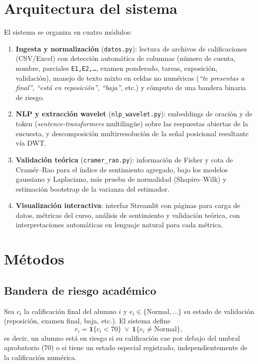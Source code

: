 \documentclass[11pt,a4paper,oneside]{article}
\theoremstyle{definition}
\begin{document}
\section{Arquitectura del sistema}

El sistema se organiza en cuatro módulos:

\begin{enumerate}[leftmargin=1.4em]
  \item \textbf{Ingesta y normalización} (\texttt{datos.py}): lectura de archivos de
  calificaciones (CSV/Excel) con detección automática de columnas (número de cuenta, nombre,
  parciales \texttt{E1,E2,\dots}, examen ponderado, tareas, exposición, validación), manejo de
  texto mixto en celdas no numéricas (\emph{``te presentas a final''}, \emph{``está en
  reposición''}, \emph{``baja''}, etc.) y cómputo de una bandera binaria de riesgo.
  \item \textbf{NLP y extracción wavelet} (\texttt{nlp\_wavelet.py}): embeddings de oración y de
  token (\emph{sentence-transformers} multilingüe) sobre las respuestas abiertas de la encuesta,
  y descomposición multirresolución de la señal posicional resultante vía DWT.
  \item \textbf{Validación teórica} (\texttt{cramer\_rao.py}): información de Fisher y cota de
  Cramér--Rao para el índice de sentimiento agregado, bajo los modelos gaussiano y Laplaciano,
  más prueba de normalidad (Shapiro--Wilk) y estimación bootstrap de la varianza del estimador.
  \item \textbf{Visualización interactiva}: interfaz Streamlit con páginas para carga de datos,
  métricas del curso, análisis de sentimiento y validación teórica, con interpretaciones
  automáticas en lenguaje natural para cada métrica.
\end{enumerate}

\section{Métodos}

\subsection{Bandera de riesgo académico}

Sea $c_i$ la calificación final del alumno $i$ y $e_i\in\{\text{Normal},\ldots\}$ su estado de
validación (reposición, examen final, baja, etc.). El sistema define
\[
r_i = \mathbf{1}\{c_i < 70\} \ \vee\ \mathbf{1}\{e_i \neq \text{Normal}\},
\]
es decir, un alumno está en riesgo si su calificación cae por debajo del umbral aprobatorio
(70) o si tiene un estado especial registrado, independientemente de la calificación numérica.
\end{document}
